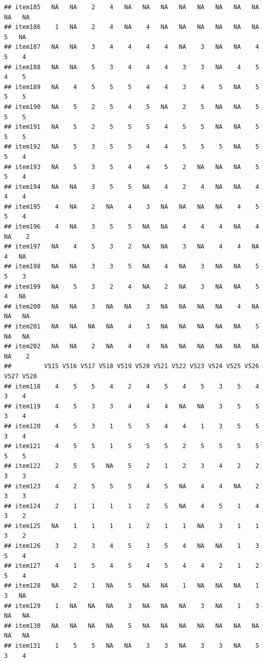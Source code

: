 \documentclass[
  man]{apa6}
\begin{document}
\begin{verbatim}
## item185   NA   NA    2    4   NA   NA   NA   NA   NA   NA   NA   NA   NA   NA
## item186    1   NA    2    4   NA    4   NA   NA   NA   NA   NA   NA    5   NA
## item187   NA   NA    3    4    4    4    4   NA    3   NA   NA    4    5    4
## item188   NA   NA    5    3    4    4    4    3    3   NA    4    5    4    5
## item189   NA    4    5    5    5    4    4    3    4    5   NA    5    5    5
## item190   NA    5    2    5    4    5   NA    2    5   NA   NA    5    5    5
## item191   NA    5    2    5    5    5    4    5    5   NA   NA    5    5    5
## item192   NA    5    3    5    5    4    4    5    5    5   NA    5    5    4
## item193   NA    5    3    5    4    4    5    2   NA   NA   NA    5    5    4
## item194   NA   NA    3    5    5   NA    4    2    4   NA   NA    4    4    4
## item195    4   NA    2   NA    4    3   NA   NA   NA   NA    4    5    5    4
## item196    4   NA    3    5    5   NA   NA    4    4    4   NA    4   NA    2
## item197   NA    4    5    3    2   NA   NA    3   NA    4    4   NA    4   NA
## item198   NA   NA    3    3    5   NA    4   NA    3   NA   NA    5    5    3
## item199   NA    5    3    2    4   NA    2   NA    3   NA   NA    5    4   NA
## item200   NA   NA    3   NA   NA    3   NA   NA   NA   NA    4   NA   NA   NA
## item201   NA   NA   NA   NA    4    3   NA   NA   NA   NA   NA    5   NA   NA
## item202   NA   NA    2   NA    4    4   NA   NA   NA   NA   NA   NA   NA    2
##         V515 V516 V517 V518 V519 V520 V521 V522 V523 V524 V525 V526 V527 V528
## item118    4    5    5    4    2    4    5    4    5    3    5    4    3    4
## item119    4    5    3    3    4    4    4   NA   NA    3    5    5    3    4
## item120    4    5    3    1    5    5    4    4    1    3    5    5    3    4
## item121    4    5    5    1    5    5    5    2    5    5    5    5    5    5
## item122    2    5    5   NA    5    2    1    2    3    4    2    2    3    3
## item123    4    2    5    5    5    4    5   NA    4    4   NA    2    3    3
## item124    2    1    1    1    1    2    5   NA    4    5    1    4    3    2
## item125   NA    1    1    1    1    2    1    1   NA    3    1    1    3    2
## item126    3    2    3    4    5    3    5    4   NA   NA    1    3    5    4
## item127    4    1    5    4    5    4    5    4    4    2    1    2    5    4
## item128   NA    2    1   NA    5   NA   NA    1   NA   NA   NA    1    3   NA
## item129    1   NA   NA   NA    3   NA   NA   NA    3   NA    1    3   NA   NA
## item130   NA   NA   NA   NA    5   NA   NA   NA   NA   NA   NA   NA   NA   NA
## item131    1    5    5   NA   NA    3    3   NA    3    3   NA    5    3    4

\end{verbatim}
\end{document}
